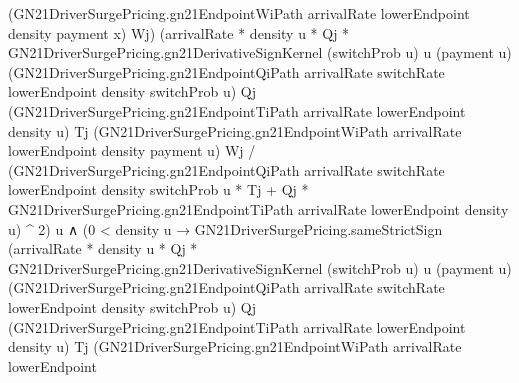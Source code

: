 \documentclass[10pt]{article}
\begin{document}
\begin{ReviewVerbatim}
                                            (GN21DriverSurgePricing.gn21EndpointWiPath arrivalRate lowerEndpoint density
                                              payment x)
                                            Wj)
                                        (arrivalRate * density u * Qj *
                                            GN21DriverSurgePricing.gn21DerivativeSignKernel (switchProb u) u (payment u)
                                              (GN21DriverSurgePricing.gn21EndpointQiPath arrivalRate switchRate
                                                lowerEndpoint density switchProb u)
                                              Qj
                                              (GN21DriverSurgePricing.gn21EndpointTiPath arrivalRate lowerEndpoint
                                                density u)
                                              Tj
                                              (GN21DriverSurgePricing.gn21EndpointWiPath arrivalRate lowerEndpoint
                                                density payment u)
                                              Wj /
                                          (GN21DriverSurgePricing.gn21EndpointQiPath arrivalRate switchRate
                                                  lowerEndpoint density switchProb u *
                                                Tj +
                                              Qj *
                                                GN21DriverSurgePricing.gn21EndpointTiPath arrivalRate lowerEndpoint
                                                  density u) ^
                                            2)
                                        u ∧
                                      (0 < density u →
                                        GN21DriverSurgePricing.sameStrictSign
                                          (arrivalRate * density u * Qj *
                                              GN21DriverSurgePricing.gn21DerivativeSignKernel (switchProb u) u
                                                (payment u)
                                                (GN21DriverSurgePricing.gn21EndpointQiPath arrivalRate switchRate
                                                  lowerEndpoint density switchProb u)
                                                Qj
                                                (GN21DriverSurgePricing.gn21EndpointTiPath arrivalRate lowerEndpoint
                                                  density u)
                                                Tj
                                                (GN21DriverSurgePricing.gn21EndpointWiPath arrivalRate lowerEndpoint

\end{ReviewVerbatim}
\end{document}
